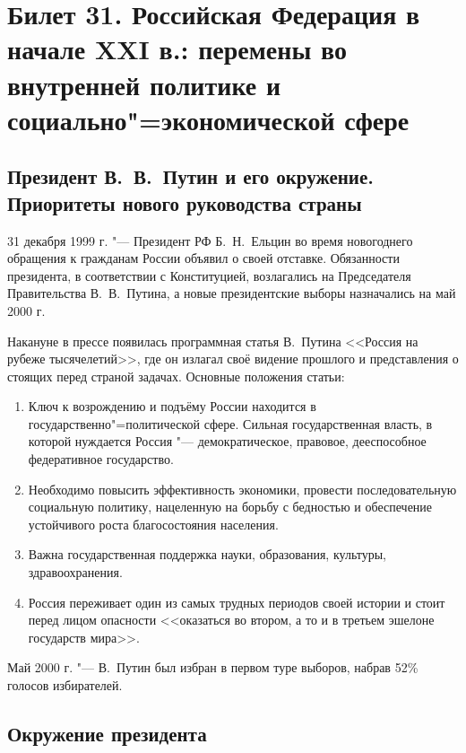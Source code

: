 \section{Билет 31. Российская Федерация в начале XXI в.: перемены во внутренней политике и социально"=экономической сфере}

\subsection{Президент В.~В.~Путин и его окружение. Приоритеты нового руководства страны}

31 декабря 1999 г. "--- Президент РФ Б.~Н.~Ельцин во время новогоднего обращения к гражданам России объявил о своей отставке. Обязанности президента, в соответствии с Конституцией, возлагались на Председателя Правительства В.~В.~Путина, а новые президентские выборы назначались на май 2000 г.

Накануне в прессе появилась программная статья В.~Путина <<Россия на рубеже тысячелетий>>, где он излагал своё видение прошлого и представления о стоящих перед страной задачах. Основные положения статьи:

\begin{enumerate}
\item Ключ к возрождению и подъёму России находится в государственно"=политической сфере. Сильная государственная власть, в которой нуждается Россия "--- демократическое, правовое, дееспособное федеративное государство.
\item Необходимо повысить эффективность экономики, провести последовательную социальную политику, нацеленную на борьбу с бедностью и обеспечение устойчивого роста благосостояния населения.
\item Важна государственная поддержка науки, образования, культуры, здравоохранения.
\item Россия переживает один из самых трудных периодов своей истории и стоит перед лицом опасности <<оказаться во втором, а то и в третьем эшелоне государств мира>>.
\end{enumerate}

Май 2000 г. "--- В.~Путин был избран в первом туре выборов, набрав 52\% голосов избирателей.

\subsection{Окружение президента}

